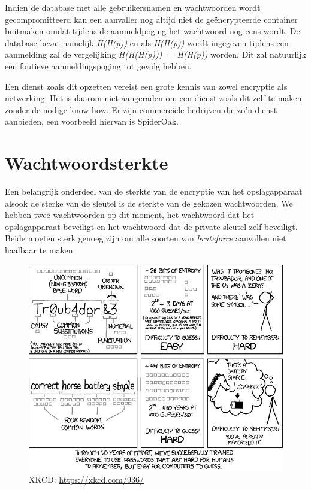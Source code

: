 Indien de database met alle gebruikersnamen en wachtwoorden wordt
gecompromitteerd kan een aanvaller nog altijd niet de geëncrypteerde container
buitmaken omdat tijdens de aanmeldpoging het wachtwoord nog eens
 wordt.
De database bevat namelijk \textit{H(H(p))} en als \textit{H(H(p))} wordt
ingegeven tijdens een aanmelding zal de vergelijking
\textit{H(H(H(p)))~=~H(H(p))} worden. Dit zal natuurlijk een foutieve
aanmeldingspoging tot gevolg
hebben.

Een dienst zoals dit opzetten vereist een grote kennis van zowel encryptie als
netwerking. Het is daarom niet aangeraden om een dienst zoals dit zelf te maken
zonder de nodige know-how. Er zijn commerciële bedrijven die zo’n dienst
aanbieden, een voorbeeld hiervan is SpiderOak.

\section{Wachtwoordsterkte}
\label{sec:wachtwoordsterkte}

Een belangrijk onderdeel van de sterkte van de encryptie van het opslagapparaat
alsook de sterke van de sleutel is de sterkte van de gekozen wachtwoorden. We
hebben twee wachtwoorden op dit moment, het wachtwoord dat het opslagapparaat
beveiligt en het wachtwoord dat de private sleutel zelf beveiligt. Beide moeten
sterk genoeg zijn om alle soorten van \textit{bruteforce} aanvallen niet
haalbaar te maken.

\begin{figure}[H]
	\includegraphics[width=\textwidth,keepaspectratio]{img/password-strength-xkcd.png}
	\centering
	\caption{XKCD: \url{https://xkcd.com/936/}}
	\label{fig:wachtwoord-sterkte-xkcd}
\end{figure}


